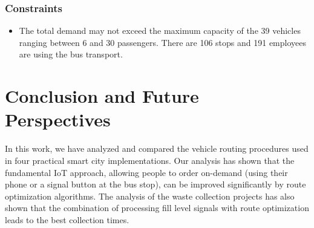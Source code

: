 \documentclass[10pt]{article}
\begin{document}
\subsubsection*{Constraints}

\begin{itemize}
\item The total demand may not exceed the maximum capacity of the 39 vehicles ranging between 6 
and 30 passengers. There are 106 stops and 191 employees are using the bus transport.

\end{itemize}










\section{Conclusion and Future Perspectives}
\label{sec:concl}

In this work, we have analyzed and compared the vehicle routing procedures used in four practical 
smart city implementations. Our analysis has shown that the fundamental IoT approach, allowing
people to order on-demand (using their phone or a signal button at the bus stop), can be improved 
significantly by route optimization algorithms. The analysis of the waste collection projects has
also shown that the combination of processing fill level signals with route optimization leads
to the best collection times.
\end{document}
